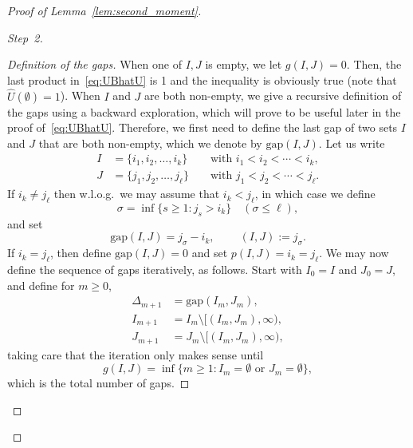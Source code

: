 \documentclass[AHL,Unicode,longabstracts]{cedram}
\newcommand{\gD}{\Delta}
\newcommand{\gs}{\sigma}
\newcommand{\hU}{\hat U}
\newcommand{\gap}{{\mathrm{gap}}}
\newenvironment{step}[1]{\begin{proof}[#1]}{\let\qed\relax \end{proof}}
\begin{document}
\begin{proof}[Proof of Lemma~\ref{lem:second_moment}]
\begin{step}{Step~2}
\begin{step}{Definition of the gaps}
When one of $I, J$ is empty, we let $g(I, J)=0$. Then, the last product in~\eqref{eq:UBhatU} is 1 and the inequality is obviously true (note that $\hU(\emptyset) = 1$). When $I$ and $J$ are both non-empty, we give a recursive definition of the gaps using a backward exploration, which will prove to be useful later in the proof of~\eqref{eq:UBhatU}. Therefore, we first need to define the last gap of two sets $I$ and $J$ that are both non-empty, which we denote by $\gap(I,J)$. Let us write
\begin{equation}
\begin{aligned}
I &= \{i_1, i_2, \ldots, i_k\} &&\text{ with } i_1 < i_2 < \cdots < i_k,\\
J &= \{j_1, j_2, \ldots, j_\ell\} &&\text{ with } j_1 < j_2 < \cdots < j_\ell.
\end{aligned}
\end{equation}
If $i_k \neq j_\ell$ then w.l.o.g.~we may assume that $i_k < j_\ell$, in which case we define
\begin{equation}
\gs = \inf\{s \geq 1 \colon j_s > i_k\} \quad (\gs \leq \ell),
\end{equation}
and set
\begin{equation}
\gap(I,J) = j_\gs - i_k, \qquad~(I,J) := j_\gs.
\end{equation}
If $i_k = j_\ell$, then define $\gap(I,J) = 0$ and set $p(I,J) = i_k = j_\ell$. We may now define the sequence of gaps iteratively, as follows. Start with $I_0 = I$ and $J_0 = J$, and define for $m \geq 0$,
\begin{equation}\label{eq:defgaps}
\begin{aligned}
\gD_{m+1} &= \gap(I_m, J_m),\\
I_{m+1} &= I_m \setminus [(I_m,J_m),\infty),\\
J_{m+1} &= J_m \setminus [(I_m,J_m),\infty),
\end{aligned}
\end{equation}
taking care that the iteration only makes sense until
\begin{equation}\label{eq:totalgap}
g(I,J) = \inf\{m \geq 1 \colon I_{m} = \emptyset \text{ or } J_{m} = \emptyset\},
\end{equation}
which is the total number of gaps.
\end{step}


\end{step}
\end{proof}
\end{document}
